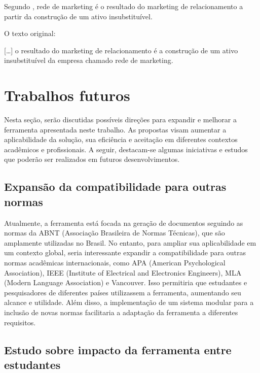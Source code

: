 \documentclass[
	12pt,				%
	oneside,			%
	a4paper,			%
	english,			%
	french,				%
	spanish,			%
	brazil				%
	]{abntex2}
\renewenvironment{quote}
  {\small\list{}{\rightmargin=0.1cm \leftmargin=4cm}%
   \item\relax}
  {\endlist}
\begin{document}
Segundo , rede de marketing é o resultado do
marketing de relacionamento a partir da construção de um ativo
insubstituível.

O texto original:

\begin{quote}
{[}\ldots{}{]} o resultado do marketing de relacionamento é a construção
de um ativo insubstituível da empresa chamado rede de marketing.
\end{quote}

\hypertarget{trabalhos-futuros}{%
\chapter{Trabalhos futuros}\label{trabalhos-futuros}}

Nesta seção, serão discutidas possíveis direções para expandir e
melhorar a ferramenta apresentada neste trabalho. As propostas visam
aumentar a aplicabilidade da solução, sua eficiência e aceitação em
diferentes contextos acadêmicos e profissionais. A seguir, destacam-se
algumas iniciativas e estudos que poderão ser realizados em futuros
desenvolvimentos.

\hypertarget{expansuxe3o-da-compatibilidade-para-outras-normas}{%
\section{Expansão da compatibilidade para outras
normas}\label{expansuxe3o-da-compatibilidade-para-outras-normas}}

Atualmente, a ferramenta está focada na geração de documentos seguindo
as normas da ABNT (Associação Brasileira de Normas Técnicas), que são
amplamente utilizadas no Brasil. No entanto, para ampliar sua
aplicabilidade em um contexto global, seria interessante expandir a
compatibilidade para outras normas acadêmicas internacionais, como APA
(American Psychological Association), IEEE (Institute of Electrical and
Electronics Engineers), MLA (Modern Language Association) e Vancouver.
Isso permitiria que estudantes e pesquisadores de diferentes países
utilizassem a ferramenta, aumentando seu alcance e utilidade. Além
disso, a implementação de um sistema modular para a inclusão de novas
normas facilitaria a adaptação da ferramenta a diferentes requisitos.

\hypertarget{estudo-sobre-impacto-da-ferramenta-entre-estudantes}{%
\section{Estudo sobre impacto da ferramenta entre
estudantes}\label{estudo-sobre-impacto-da-ferramenta-entre-estudantes}}
\end{document}
